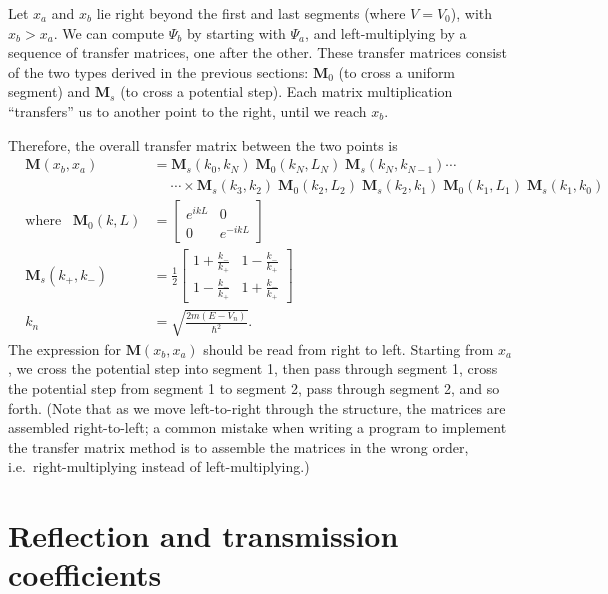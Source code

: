 \documentclass[pra,12pt]{revtex4}
\begin{document}
Let $x_a$ and $x_b$ lie right beyond the first and last segments
(where $V = V_0$), with $x_b > x_a$.  We can compute $\Psi_b$ by
starting with $\Psi_a$, and left-multiplying by a sequence of transfer
matrices, one after the other.  These transfer matrices consist of the
two types derived in the previous sections: $\mathbf{M}_0$ (to cross a
uniform segment) and $\mathbf{M}_s$ (to cross a potential step).  Each
matrix multiplication ``transfers'' us to another point to the right,
until we reach $x_b$.

Therefore, the overall transfer matrix between the two points is
$$\boxed{\;\;\;\begin{aligned}\mathbf{M}(x_b, x_a) &= \mathbf{M}_s(k_0,k_N)\; \mathbf{M}_0(k_N,L_N) \; \mathbf{M}_s(k_N, k_{N-1}) \cdots \\ & \quad\;\cdots \times \mathbf{M}_s(k_3, k_2)\; \mathbf{M}_0(k_2,L_2) \; \mathbf{M}_s(k_2, k_1) \; \mathbf{M}_0(k_1,L_1) \; \mathbf{M}_s(k_1,k_0) \;\;\;\\ \mathrm{where}\;\;\; \mathbf{M}_0(k,L) &= \begin{bmatrix}e^{ikL} & 0 \\ 0 & e^{-ikL}\end{bmatrix} \\ \mathbf{M}_s(k_+,k_-) &= \frac{1}{2} \begin{bmatrix}1+\frac{k_-}{k_+} & 1-\frac{k_-}{k_+} \\ 1-\frac{k_-}{k_+} & 1+\frac{k_-}{k_+}\end{bmatrix}\\ k_n &= \sqrt{\frac{2m(E-V_n)}{\hbar^2}}.\end{aligned}}$$
The expression for $\mathbf{M}(x_b,x_a)$ should be read from right to
left.  Starting from $x_a$, we cross the potential step into segment
1, then pass through segment 1, cross the potential step from segment
1 to segment 2, pass through segment 2, and so forth.  (Note that as
we move left-to-right through the structure, the matrices are
assembled right-to-left; a common mistake when writing a program to
implement the transfer matrix method is to assemble the matrices in
the wrong order, i.e.~right-multiplying instead of left-multiplying.)

\section{Reflection and transmission coefficients}
\end{document}
